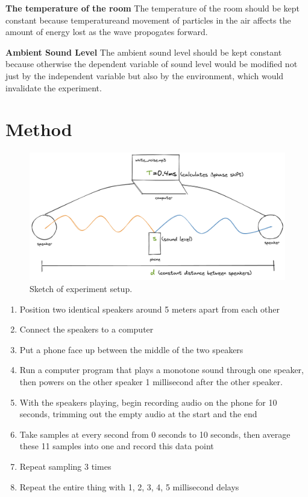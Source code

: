 \documentclass[index]{subfiles}
\begin{document}
\textbf{The temperature of the room} The temperature of the room should be kept constant because temperatureand movement of particles in the air affects the amount of energy lost as the wave propogates forward.

\textbf{Ambient Sound Level} The ambient sound level should be kept constant because otherwise the dependent variable of sound level would be modified not just by the independent variable but also by the environment, which would invalidate the experiment.

\section{Method}

\begin{figure}[H]
    \centering
    \includegraphics[scale=0.24]{sound_diagram.png}
    \caption{Sketch of experiment setup.}
\end{figure}

\begin{enumerate}
    \item Position two identical speakers around 5 meters apart from each other
    \item Connect the speakers to a computer
    \item Put a phone face up between the middle of the two speakers
    \item Run a computer program that plays a monotone sound through one speaker, then powers on the other speaker 1 millisecond after the other speaker.
    \item With the speakers playing, begin recording audio on the phone for 10 seconds, trimming out the empty audio at the start and the end
    \item Take samples at every second from 0 seconds to 10 seconds, then average these 11 samples into one and record this data point
    \item Repeat sampling 3 times
    \item Repeat the entire thing with 1, 2, 3, 4, 5 millisecond delays
\end{enumerate}
\end{document}
